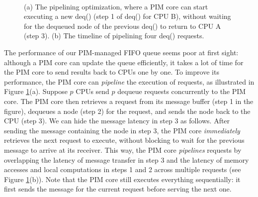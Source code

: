 \begin{figure}[ht!]
\centering
{}
\\

\caption{(a) The pipelining optimization, where a PIM core can start executing 
a new deq() (step 1 of deq() for CPU B), without waiting for the dequeued node of 
the previous deq() to return to CPU A (step 3). 
(b) The timeline of pipelining four deq() requests.}
\label{figure:queue_pipeline}
\end{figure}

The performance of our PIM-managed FIFO queue seems poor at first sight: although a PIM core can update 
the queue efficiently, it takes a lot of time for the PIM core to send results back to CPUs one by one. 
To improve its performance, the PIM core can \textit{pipeline} the execution of requests, 
as illustrated in Figure \ref{figure:queue_pipeline}(a). 
Suppose $p$ CPUs send $p$ dequeue requests concurrently to the PIM core. 
The PIM core then retrieves a request from its message buffer (step 1 in the figure), 
dequeues a node (step 2) for the request, and sends the node back to the CPU (step 3). 
We can hide the message latency in step 3 as follows. 
After sending the message containing the node in step 3, the PIM core \emph{immediately} retrieves the next 
request to execute, without blocking to wait for the previous message to arrive at its receiver. 
This way, the PIM core \emph{pipelines} requests by overlapping the latency of message transfer in step 3  
and the latency of memory accesses and local computations in steps 1 and 2 across multiple requests 
(see Figure \ref{figure:queue_pipeline}(b)). 
Note that the PIM core still executes everything sequentially: 
 it first sends the message for the current request before serving the next one.
 
